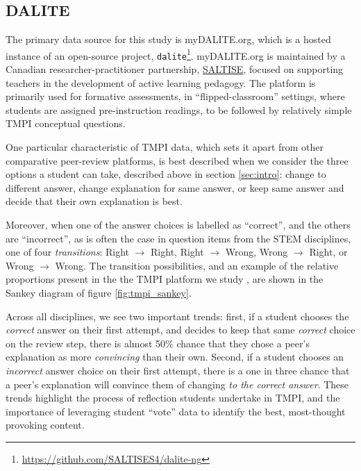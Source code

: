 \documentclass[notitlepage,12pt]{jedm}
\begin{document}
\subsection{DALITE}\label{sec:dataset_dalite}
The primary data source for this study is myDALITE.org, which is a hosted 
instance of an open-source project, 
\verb|dalite|\footnote{\url{https://github.com/SALTISES4/dalite-ng}}. 
myDALITE.org is maintained by a Canadian researcher-practitioner partnership, 
\href{saltise.ca}{SALTISE}, focused on supporting teachers in the development 
of active learning pedagogy.
The platform is primarily used for formative assessments, in 
``flipped-classroom'' settings, where students are assigned pre-instruction 
readings, to be followed by relatively simple TMPI conceptual questions.

One particular characteristic of TMPI data, which sets it apart from other 
comparative peer-review platforms, is best described when we consider the three 
options a student can take, described above in section \ref{sec:intro}: change 
to different answer, change explanation for same answer, or keep same answer 
and decide that their own explanation is best.

Moreover, when one of the answer choices is labelled as ``correct'', and the 
others are ``incorrect'', as is often the case in question items from the STEM 
disciplines, one of four \textit{transitions}: Right $\rightarrow$ Right, Right 
$\rightarrow$ Wrong, Wrong $\rightarrow$ Right, or Wrong $\rightarrow$ Wrong.
The transition possibilities, and an example of the relative proportions 
present in the the TMPI platform we study \cite{bhatnagar_dataset_2020}, are 
shown in the Sankey diagram of figure \ref{fig:tmpi_sankey}.

Across all disciplines, we see two important trends: first, if a student 
chooses the \textit{correct} answer on their first attempt, and decides to keep 
that same \textit{correct} choice on the review step, there is almost 50\% 
chance that they chose a peer's explanation as more \textit{convincing}  than 
their own. 
Second, if a student chooses an \textit{incorrect} answer choice on their first 
attempt, there is a one in three chance that a peer's explanation will convince 
them of changing \textit{to the correct answer}.
These trends highlight the process of reflection students undertake in TMPI, 
and the importance of leveraging student ``vote'' data to identify the best, 
most-thought provoking content.
\end{document}
